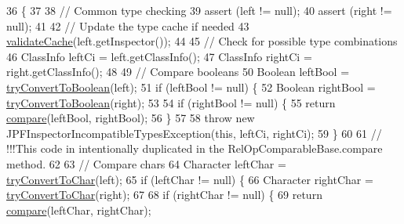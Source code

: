 \begin{DoxyCode}
36                                                                                                            
                                        \{
37 
38     \textcolor{comment}{// Common type checking}
39     assert (left != null);
40     assert (right != null);
41 
42     \textcolor{comment}{// Update the type cache if needed}
43     \hyperlink{classgov_1_1nasa_1_1jpf_1_1inspector_1_1server_1_1programstate_1_1relop_1_1_rel_op_comparable_base_a7e8b465bb4002c1759b6096f9e2eecbf}{validateCache}(left.getInspector());
44 
45     \textcolor{comment}{// Check for possible type combinations}
46     ClassInfo leftCi = left.getClassInfo();
47     ClassInfo rightCi = right.getClassInfo();
48 
49     \textcolor{comment}{// Compare booleans}
50     Boolean leftBool = \hyperlink{classgov_1_1nasa_1_1jpf_1_1inspector_1_1server_1_1programstate_1_1relop_1_1_rel_op_equal_base_a398f9f097b49e1d7c1f826e1a81fed5c}{tryConvertToBoolean}(left);
51     \textcolor{keywordflow}{if} (leftBool != null) \{
52       Boolean rightBool = \hyperlink{classgov_1_1nasa_1_1jpf_1_1inspector_1_1server_1_1programstate_1_1relop_1_1_rel_op_equal_base_a398f9f097b49e1d7c1f826e1a81fed5c}{tryConvertToBoolean}(right);
53 
54       \textcolor{keywordflow}{if} (rightBool != null) \{
55         \textcolor{keywordflow}{return} \hyperlink{classgov_1_1nasa_1_1jpf_1_1inspector_1_1server_1_1programstate_1_1relop_1_1_rel_op_equal_base_a89a8988e7ff80fd175542cf45f5f18d3}{compare}(leftBool, rightBool);
56       \}
57 
58       \textcolor{keywordflow}{throw} \textcolor{keyword}{new} JPFInspectorIncompatibleTypesException(\textcolor{keyword}{this}, leftCi, rightCi);
59     \}
60 
61     \textcolor{comment}{// !!!This code in intentionally duplicated in the RelOpComparableBase.compare method.}
62 
63     \textcolor{comment}{// Compare chars}
64     Character leftChar = \hyperlink{classgov_1_1nasa_1_1jpf_1_1inspector_1_1server_1_1programstate_1_1relop_1_1_rel_op_comparable_base_a1e3bca3adb8c3a790eaad60d9adf5c47}{tryConvertToChar}(left);
65     \textcolor{keywordflow}{if} (leftChar != null) \{
66       Character rightChar = \hyperlink{classgov_1_1nasa_1_1jpf_1_1inspector_1_1server_1_1programstate_1_1relop_1_1_rel_op_comparable_base_a1e3bca3adb8c3a790eaad60d9adf5c47}{tryConvertToChar}(right);
67 
68       \textcolor{keywordflow}{if} (rightChar != null) \{
69         \textcolor{keywordflow}{return} \hyperlink{classgov_1_1nasa_1_1jpf_1_1inspector_1_1server_1_1programstate_1_1relop_1_1_rel_op_equal_base_a89a8988e7ff80fd175542cf45f5f18d3}{compare}(leftChar, rightChar);

\end{DoxyCode}
